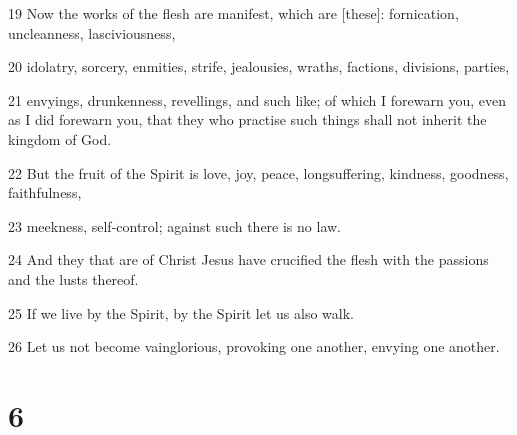 \par 19 Now the works of the flesh are manifest, which are [these]: fornication, uncleanness, lasciviousness,
\par 20 idolatry, sorcery, enmities, strife, jealousies, wraths, factions, divisions, parties,
\par 21 envyings, drunkenness, revellings, and such like; of which I forewarn you, even as I did forewarn you, that they who practise such things shall not inherit the kingdom of God.
\par 22 But the fruit of the Spirit is love, joy, peace, longsuffering, kindness, goodness, faithfulness,
\par 23 meekness, self-control; against such there is no law.
\par 24 And they that are of Christ Jesus have crucified the flesh with the passions and the lusts thereof.
\par 25 If we live by the Spirit, by the Spirit let us also walk.
\par 26 Let us not become vainglorious, provoking one another, envying one another.

\chapter{6}

